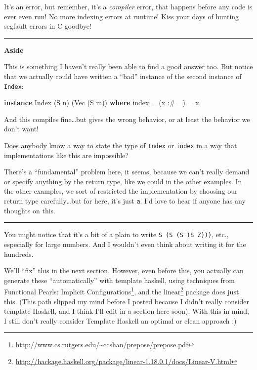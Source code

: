 \documentclass[]{article}
\newenvironment{Shaded}{}{}
\newcommand{\DataTypeTok}[1]{\textcolor[rgb]{0.56,0.13,0.00}{#1}}
\newcommand{\FunctionTok}[1]{\textcolor[rgb]{0.02,0.16,0.49}{#1}}
\newcommand{\KeywordTok}[1]{\textcolor[rgb]{0.00,0.44,0.13}{\textbf{#1}}}
\newcommand{\NormalTok}[1]{#1}
\renewcommand{\href}[2]{#2\footnote{\url{#1}}}
\begin{document}
It's an error, but remember, it's a \emph{compiler} error, that happens before
any code is ever even run! No more indexing errors at runtime! Kiss your days of
hunting segfault errors in C goodbye!

\begin{center}\rule{0.5\linewidth}{\linethickness}\end{center}

\textbf{Aside}

This is something I haven't really been able to find a good answer too. But
notice that we actually could have written a ``bad'' instance of the second
instance of \texttt{Index}:

\begin{Shaded}
\begin{Highlighting}[]
\KeywordTok{instance} \DataTypeTok{Index}\NormalTok{ (}\DataTypeTok{S}\NormalTok{ n) (}\DataTypeTok{Vec}\NormalTok{ (}\DataTypeTok{S}\NormalTok{ m)) }\KeywordTok{where}
\NormalTok{    index _ (x }\FunctionTok{:#}\NormalTok{ _) }\FunctionTok{=}\NormalTok{ x}
\end{Highlighting}
\end{Shaded}

And this compiles fine\ldots{}but gives the wrong behavior, or at least the
behavior we don't want!

Does anybody know a way to state the type of \texttt{Index} or \texttt{index} in
a way that implementations like this are impossible?

There's a ``fundamental'' problem here, it seems, because we can't really demand
or specify anything by the return type, like we could in the other examples. In
the other examples, we sort of restricted the implementation by choosing our
return type carefully\ldots{}but for here, it's just \texttt{a}. I'd love to
hear if anyone has any thoughts on this.

\begin{center}\rule{0.5\linewidth}{\linethickness}\end{center}

You might notice that it's a bit of a plain to write
\texttt{S\ (S\ (S\ (S\ Z)))}, etc., especially for large numbers. And I wouldn't
even think about writing it for the hundreds.

We'll ``fix'' this in the next section. However, even before this, you actually
can generate these ``automatically'' with template haskell, using techniques
from \href{http://www.cs.rutgers.edu/~ccshan/prepose/prepose.pdf}{Functional
Pearls: Implicit Configurations}, and the
\href{http://hackage.haskell.org/package/linear-1.18.0.1/docs/Linear-V.html}{linear}
package does just this. (This path slipped my mind before I posted because I
didn't really consider template Haskell, and I think I'll edit in a section here
soon). With this in mind, I still don't really consider Template Haskell an
optimal or clean approach :)
\end{document}
